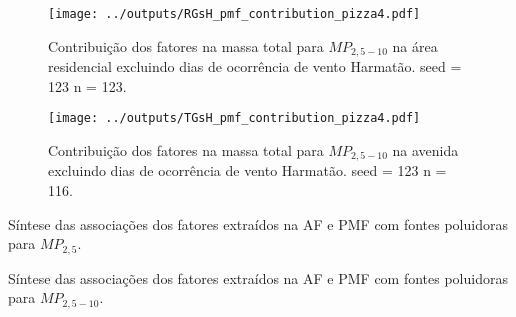 \begin{landscape}
  \begin{figure}
    \centering
    \begin{minipage}[b]{0.45\linewidth}
      \texttt{[image: ../outputs/RGsH\_pmf\_contribution\_pizza4.pdf]}
      \caption{Contribuição dos fatores na massa total para $MP_{2,5-10}$ na área
               residencial excluindo dias de ocorrência de vento Harmatão. seed = 123 n = 123.
               \label{fig:RGsH_contribution4}}
    \end{minipage}%
    \hspace{0.5cm}
    \begin{minipage}[b]{0.45\linewidth}
      
    \end{minipage}
  \end{figure}
\end{landscape}


\begin{landscape}
  \begin{figure}
    \centering
    \begin{minipage}[b]{0.45\linewidth}
      \texttt{[image: ../outputs/TGsH\_pmf\_contribution\_pizza4.pdf]}
      \caption{Contribuição dos fatores na massa total para $MP_{2,5-10}$ na avenida
               excluindo dias de ocorrência de vento Harmatão. seed = 123 n = 116.
               \label{fig:TGsH_contribution4}}
    \end{minipage}%
    \hspace{0.5cm}
    \begin{minipage}[b]{0.45\linewidth}
      
    \end{minipage}
  \end{figure}
\end{landscape}


\begin{landscape}
\begin{table}[H]
  \centering
  
  \caption{Síntese das associações dos fatores extraídos na AF e PMF com fontes 
           poluidoras para $MP_{2,5}$. \label{sintese_fino}}
\end{table}

\begin{table}[H]
  \centering
  
  \caption{Síntese das associações dos fatores extraídos na AF e PMF com fontes 
           poluidoras para $MP_{2,5-10}$. \label{sintese_grosso}}
\end{table}

\end{landscape}

